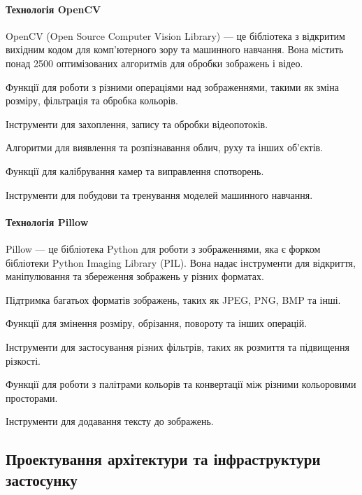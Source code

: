\documentclass[oneside,14pt]{extarticle}
\begin{document}
\paragraph{Технологія OpenCV}

OpenCV (Open Source Computer Vision Library) — це бібліотека з відкритим вихідним кодом для комп'ютерного зору та машинного навчання. Вона містить понад 2500 оптимізованих алгоритмів для обробки зображень і відео.

\begin{list}{-}{Основні можливості OpenCV:}
	\item Функції для роботи з різними операціями над зображеннями, такими як зміна розміру, фільтрація та обробка кольорів.
	\item Інструменти для захоплення, запису та обробки відеопотоків.
	\item Алгоритми для виявлення та розпізнавання облич, руху та інших об'єктів.
	\item Функції для калібрування камер та виправлення спотворень.
	\item Інструменти для побудови та тренування моделей машинного навчання.
\end{list}

\paragraph{Технологія Pillow}

Pillow — це бібліотека Python для роботи з зображеннями, яка є форком бібліотеки Python Imaging Library (PIL). Вона надає інструменти для відкриття, маніпулювання та збереження зображень у різних форматах.

\begin{list}{-}{Основні можливості Pillow:}
	\item Підтримка багатьох форматів зображень, таких як JPEG, PNG, BMP та інші.
	\item Функції для змінення розміру, обрізання, повороту та інших операцій.
	\item Інструменти для застосування різних фільтрів, таких як розмиття та підвищення різкості.
	\item Функції для роботи з палітрами кольорів та конвертації між різними кольоровими просторами.
	\item Інструменти для додавання тексту до зображень.
\end{list}

\subsection{Проектування архітектури та інфраструктури застосунку}
\end{document}
